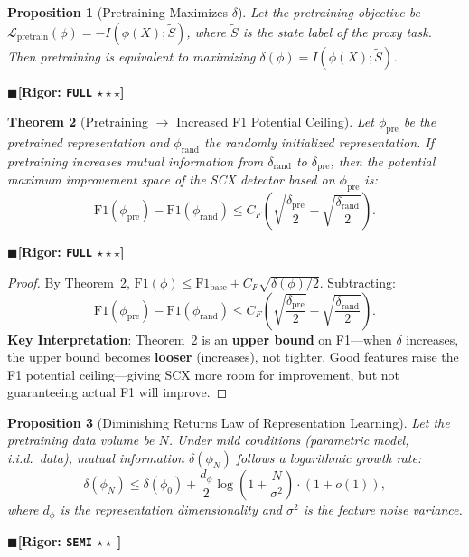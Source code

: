 \documentclass[12pt,a4paper]{article}
\newtheorem{theorem}{Theorem}[section]
\newtheorem{proposition}[theorem]{Proposition}
\theoremstyle{definition}
\theoremstyle{remark}
\newcommand{\rigorFull}{$\blacksquare$\;\textbf{[Rigor: \texttt{FULL} $\star\star\star$]}}
\newcommand{\rigorSemi}{$\blacksquare$\;\textbf{[Rigor: \texttt{SEMI} $\star\star\;$]}}
\begin{document}
\begin{proposition}[Pretraining Maximizes $\delta$]
\label{prop:7}
Let the pretraining objective be $\mathcal{L}_{\text{pretrain}}(\phi) = -I(\phi(X); \tilde{S})$, where $\tilde{S}$ is the state label of the proxy task. Then pretraining is equivalent to maximizing $\delta(\phi) = I(\phi(X); \tilde{S})$.
\end{proposition}
\rigorFull

\begin{theorem}[Pretraining $\to$ Increased F1 Potential Ceiling]
\label{thm:4.1}
Let $\phi_{\text{pre}}$ be the pretrained representation and $\phi_{\text{rand}}$ the randomly initialized representation. If pretraining increases mutual information from $\delta_{\text{rand}}$ to $\delta_{\text{pre}}$, then the potential maximum improvement space of the SCX detector based on $\phi_{\text{pre}}$ is:
\begin{equation}
\boxed{\mathrm{F1}(\phi_{\text{pre}}) - \mathrm{F1}(\phi_{\text{rand}}) \leq C_F\left(\sqrt{\frac{\delta_{\text{pre}}}{2}} - \sqrt{\frac{\delta_{\text{rand}}}{2}}\right)}.
\end{equation}
\end{theorem}
\rigorFull

\begin{proof}
By Theorem~2, $\mathrm{F1}(\phi) \leq \mathrm{F1}_{\text{base}} + C_F\sqrt{\delta(\phi)/2}$. Subtracting:
\begin{equation}
\mathrm{F1}(\phi_{\text{pre}}) - \mathrm{F1}(\phi_{\text{rand}}) \leq C_F\left(\sqrt{\frac{\delta_{\text{pre}}}{2}} - \sqrt{\frac{\delta_{\text{rand}}}{2}}\right).
\end{equation}
\textbf{Key Interpretation}: Theorem~2 is an \textbf{upper bound} on F1---when $\delta$ increases, the upper bound becomes \textbf{looser} (increases), not tighter. Good features raise the F1 potential ceiling---giving SCX more room for improvement, but not guaranteeing actual F1 will improve.
\end{proof}

\begin{proposition}[Diminishing Returns Law of Representation Learning]
\label{prop:8}
Let the pretraining data volume be $N$. Under mild conditions (parametric model, i.i.d.\ data), mutual information $\delta(\phi_N)$ follows a logarithmic growth rate:
\begin{equation}
\delta(\phi_N) \leq \delta(\phi_0) + \frac{d_\phi}{2}\log\left(1 + \frac{N}{\sigma^2}\right) \cdot (1 + o(1)),
\end{equation}
where $d_\phi$ is the representation dimensionality and $\sigma^2$ is the feature noise variance.
\end{proposition}
\rigorSemi
\end{document}
